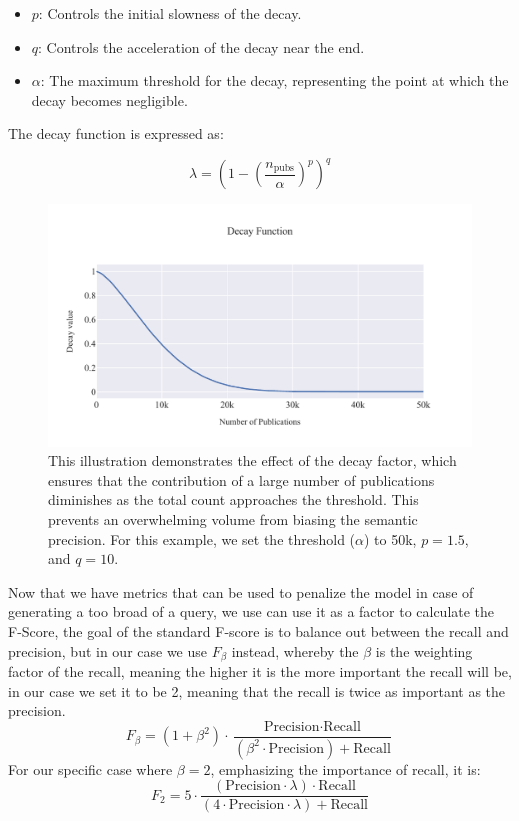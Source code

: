 \begin{itemize}
	\item \( p \): Controls the initial slowness of the decay.
	\item \( q \): Controls the acceleration of the decay near the end.
	\item $\alpha$: The maximum threshold for the decay, representing the point at which the decay becomes negligible.
\end{itemize}

The decay function is expressed as:

\[
\lambda = \left(1 - \left(\frac{n_{\text{pubs}}}{\alpha}\right)^p\right)^q
\]


\begin{figure}[h!]
	\centering	
	\includegraphics[scale=0.7]{pics/decay_function.pdf}
	\caption[Decay Function for Semantic Precision]{This illustration demonstrates the effect of the decay factor, which ensures that the contribution of a large number of publications diminishes as the total count approaches the threshold. This prevents an overwhelming volume from biasing the semantic precision. For this example, we set the threshold (\( \alpha \)) to 50k, \( p=1.5 \), and \( q=10 \).}	
	\label{fig:decay-function}
\end{figure}


Now that we have metrics that can be used to penalize the model in case of generating a too broad of a query, we use can use it as a factor to calculate the F-Score, the goal of the standard F-score is to balance out between the recall and precision, but in our case we use $F_\beta$ instead, whereby the $\beta$ is the weighting factor of the recall, meaning the higher it is the more important the recall will be, in our case we set it to be 2, meaning that the recall is twice as important as the precision.
\begin{equation}\label{eq:f-beta}
F_\beta = (1 + \beta^2) \cdot \frac{\text{Precision} \cdot \text{Recall}}{(\beta^2 \cdot \text{Precision}) + \text{Recall}}
\end{equation}
For our specific case where $\beta = 2$, emphasizing the importance of recall, it is:
\[
	F_2 = 5 \cdot \frac{(\text{Precision} \cdot \lambda) \cdot \text{Recall}}{(4 \cdot \text{Precision}\cdot \lambda) + \text{Recall}}
\]

